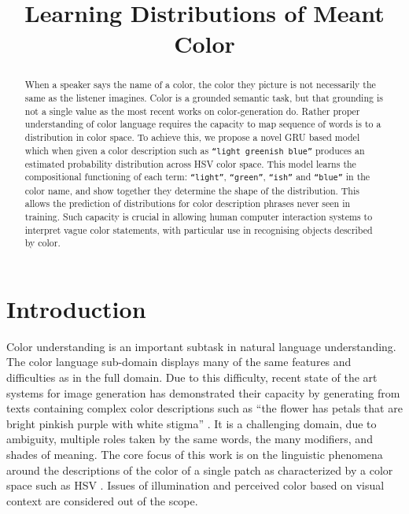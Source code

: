 \documentclass[11pt,letterpaper]{article}
\title{Learning Distributions of Meant Color}
\author{}
\date{}
\newcommand{\parencite}{\cite}
\begin{document}
\maketitle

\begin{abstract}
When a speaker says the name of a color, the color they picture is not necessarily the same as the listener imagines.
Color is a grounded semantic task, but that grounding is not a single value as the most recent works on color-generation do.
Rather proper understanding of color language requires the capacity to map sequence of words is to a distribution in color space.
To achieve this, we propose a novel GRU based model which when given a color description such as \texttt{``light greenish blue''} produces an estimated probability distribution across HSV color space.
This model learns the compositional functioning of each term: \texttt{``light''}, \texttt{``green''}, \texttt{``ish''} and \texttt{``blue''} in the color name, and show together they determine the shape of the distribution.
This allows the prediction of  distributions for color description phrases never seen in training.
Such capacity is crucial in allowing human computer interaction systems to interpret vague color statements, with particular use in recognising objects described by color.
\end{abstract}

\section{Introduction}

Color understanding is an important subtask in natural language understanding.
The color language sub-domain displays many of the same features and difficulties as in the full domain.
Due to this difficulty, recent state of the art systems for image generation has demonstrated their capacity by generating from texts containing complex color descriptions such as ``the flower has petals that are bright pinkish purple with white stigma'' \parencite{reed2016generative, 2015arXiv151102793M}.
It is a challenging domain, due to ambiguity, multiple roles taken by the same words, the many modifiers, and shades of meaning.
The core focus of this work is on the linguistic phenomena around the descriptions of the color of a single patch as characterized by a color space such as HSV \parencite{smith1978color}.
Issues of illumination and perceived color based on visual context are considered out of the scope.
\end{document}
